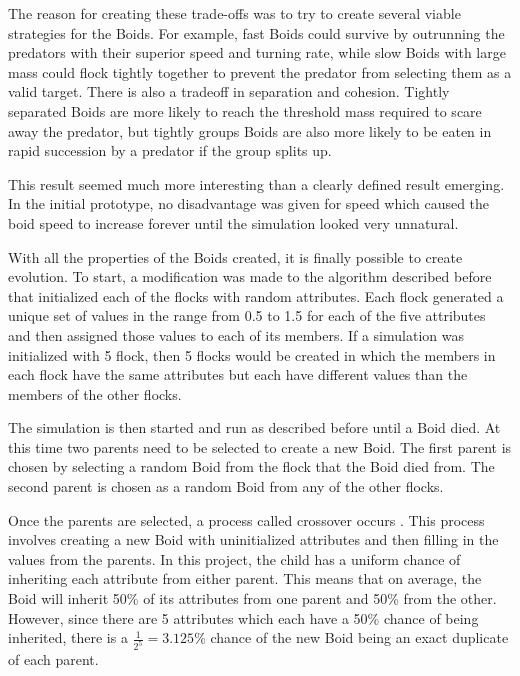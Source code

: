 \documentclass{egpubl}
\begin{document}
The reason for creating these trade-offs was to try to create several viable strategies for the Boids. For example, fast Boids could survive by outrunning the predators with their superior speed and turning rate, while slow Boids with large mass could flock tightly together to prevent the predator from selecting them as a valid target. There is also a tradeoff in separation and cohesion. Tightly separated Boids are more likely to reach the threshold mass required to scare away the predator, but tightly groups Boids are also more likely to be eaten in rapid succession by a predator if the group splits up.
\par
This result seemed much more interesting than a clearly defined result emerging. In the initial prototype, no disadvantage was given for speed which caused the boid speed to increase forever until the simulation looked very unnatural. 
\par
With all the properties of the Boids created, it is finally possible to create evolution. To start, a modification was made to the algorithm described before that initialized each of the flocks with random attributes. Each flock generated a unique set of values in the range from 0.5 to 1.5 for each of the five attributes and then assigned those values to each of its members. If a simulation was initialized with 5 flock, then 5 flocks would be created in which the members in each flock have the same attributes but each have different values than the members of the other flocks.
\par
The simulation is then started and run as described before until a Boid died. At this time two parents need to be selected to create a new Boid. The first parent is chosen by selecting a random Boid from the flock that the Boid died from. The second parent is chosen as a random Boid from any of the other flocks.
\par
Once the parents are selected, a process called crossover occurs \cite{vMall}. This process involves creating a new Boid with uninitialized attributes and then filling in the values from the parents. In this project, the child has a uniform chance of inheriting each attribute from either parent. This means that on average, the Boid will inherit 50\% of its attributes from one parent and 50\% from the other. However, since there are 5 attributes which each have a 50\% chance of being inherited, there is a $\frac{1}{2^5} = 3.125\%$ chance of the new Boid being an exact duplicate of each parent.
\end{document}
